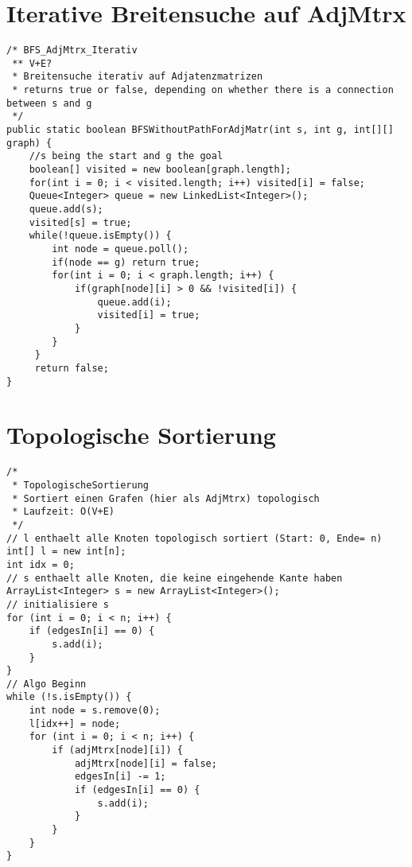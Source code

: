 \documentclass[10pt,a4paper]{article}
\begin{document}
\section{Iterative Breitensuche auf AdjMtrx}
\begin{lstlisting}
/* BFS_AdjMtrx_Iterativ
 ** V+E?
 * Breitensuche iterativ auf Adjatenzmatrizen
 * returns true or false, depending on whether there is a connection between s and g
 */
public static boolean BFSWithoutPathForAdjMatr(int s, int g, int[][] graph) {
    //s being the start and g the goal
    boolean[] visited = new boolean[graph.length];
    for(int i = 0; i < visited.length; i++) visited[i] = false;
    Queue<Integer> queue = new LinkedList<Integer>();
    queue.add(s);
    visited[s] = true;
    while(!queue.isEmpty()) {
        int node = queue.poll();
        if(node == g) return true;
        for(int i = 0; i < graph.length; i++) {
            if(graph[node][i] > 0 && !visited[i]) {
                queue.add(i);
                visited[i] = true;
            }
        }
     }
     return false;
}
\end{lstlisting}
\section{Topologische Sortierung}
\begin{lstlisting}
/*
 * TopologischeSortierung
 * Sortiert einen Grafen (hier als AdjMtrx) topologisch
 * Laufzeit: O(V+E)
 */
// l enthaelt alle Knoten topologisch sortiert (Start: 0, Ende= n)
int[] l = new int[n];
int idx = 0;
// s enthaelt alle Knoten, die keine eingehende Kante haben
ArrayList<Integer> s = new ArrayList<Integer>();
// initialisiere s
for (int i = 0; i < n; i++) {
	if (edgesIn[i] == 0) {
		s.add(i);
	}
}
// Algo Beginn
while (!s.isEmpty()) {
	int node = s.remove(0);
	l[idx++] = node;
	for (int i = 0; i < n; i++) {
		if (adjMtrx[node][i]) {
			adjMtrx[node][i] = false;
			edgesIn[i] -= 1;
			if (edgesIn[i] == 0) {
				s.add(i);
			}
		}
	}
}
\end{lstlisting}
\end{document}
